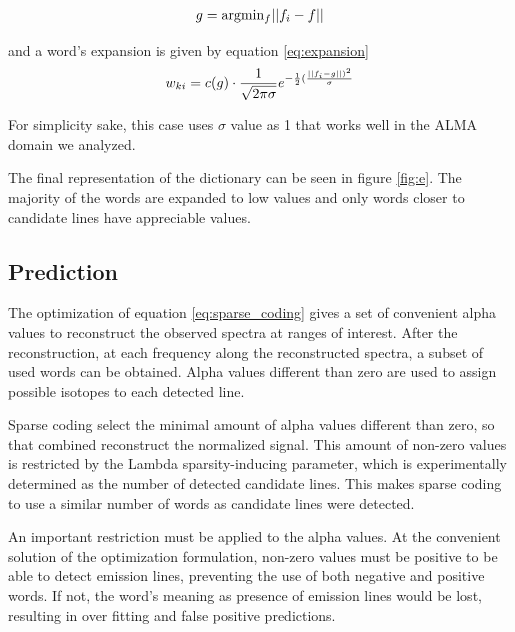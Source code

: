 \begin{equation}
	\label{eq:closer_candidate}
	\begin{aligned}
		\text{$ g $}
		= 
		\text{argmin}
		& _{f} ||f_i - f|| \\
	\end{aligned}
\end{equation}

and a word's expansion is given by equation \ref{eq:expansion}
\begin{equation}
	\begin{aligned}
	\text{$ w_{ki} $}
	= \text{$ c{(g)} $} \cdot \frac{1}{\sqrt{2\pi\sigma}}e^{-\frac{1}{2} (\frac{||f_i - g ||) ^2}{\sigma}}
	\label{eq:expansion}
	\end{aligned}
\end{equation}

For simplicity sake, this case uses $\sigma$ value as 1 that works well in the ALMA domain we analyzed. 

The final representation of the dictionary can be seen in figure \ref{fig:e}. The majority of the words are expanded to low values and only words closer to candidate lines have appreciable values.
    
 
\subsection{Prediction} \label{sec:prediction}
The optimization of equation \ref{eq:sparse_coding} gives a set of convenient alpha values to reconstruct the observed spectra at ranges of interest.
After the reconstruction, at each frequency along the reconstructed spectra, a subset of used words can be obtained.
Alpha values different than zero are used to assign possible isotopes to each detected line. 

Sparse coding select the minimal amount of alpha values different than zero, so that combined reconstruct the normalized signal.
This amount of non-zero values is restricted by the Lambda sparsity-inducing parameter, which is experimentally determined as the number of detected candidate lines.
This makes sparse coding to use a similar number of words as candidate lines were detected.

An important restriction must be applied to the alpha values.
At the convenient solution of the optimization formulation, non-zero values must be positive to be able to detect emission lines, preventing the use of both negative and positive words.
If not, the word's meaning as presence of emission lines would be lost, resulting in over fitting and false positive predictions.


